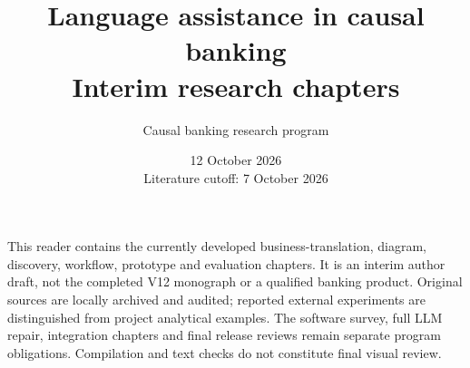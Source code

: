 \documentclass[11pt,openany]{book}
\title{Language assistance in causal banking\\\large Interim research chapters}
\author{Causal banking research program}
\date{12 October 2026\\Literature cutoff: 7 October 2026}
\begin{document}
\pagestyle{plain}
\raggedbottom
\maketitle
\thispagestyle{empty}
\noindent This reader contains the currently developed business-translation,
diagram, discovery, workflow, prototype and evaluation chapters.
It is an interim author draft, not the completed V12 monograph or a
qualified banking product. Original sources are locally archived and audited;
reported external experiments are distinguished from project analytical examples.
The software survey, full LLM repair, integration chapters and final release
reviews remain separate program obligations. Compilation and text checks do
not constitute final visual review.
\tableofcontents






\label{la:body-end}\clearpage

\end{document}
